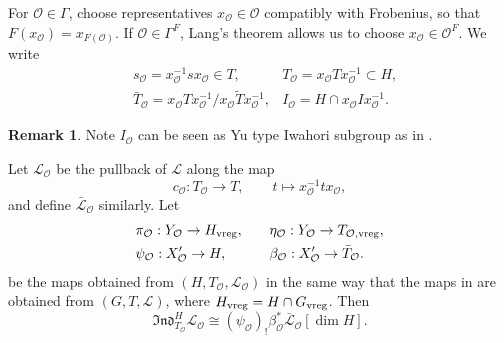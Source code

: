 \documentclass[11pt,letterpaper]{amsart}
\theoremstyle{definition}
\newtheorem{remark}[theorem]{Remark}
\numberwithin{equation}{section}
\numberwithin{theorem}{section}
\begin{document}
For \(\mathcal O\in\Gamma\), choose representatives
\(x_{\mathcal O}\in\mathcal O\) compatibly with Frobenius, so that
\(F(x_{\mathcal O})=x_{F(\mathcal O)}\).  If
\(\mathcal O\in\Gamma^F\), Lang's theorem allows us to choose
\(x_{\mathcal O}\in\mathcal O^F\).  We write
\begin{align*}
&s_{\mathcal O}=x_{\mathcal O}^{-1}sx_{\mathcal O}\in T,
&T_{\mathcal O}=x_{\mathcal O}Tx_{\mathcal O}^{-1}\subset H,\\
&\bar{T}_{\mathcal O}=x_{\mathcal O}Tx_{\mathcal O}^{-1}/x_{\mathcal O}\tilde{T}x_{\mathcal O}^{-1},
&I_{\mathcal O}
 =H\cap x_{\mathcal O}Ix_{\mathcal O}^{-1}.        
\end{align*}
\begin{remark}
Note $I_{\mathcal O}$ can be seen as Yu type Iwahori subgroup as in . 
\end{remark}

Let $\mathcal L_{\mathcal O}$ be the pullback of $\mathcal L$ along
the map
\[
 c_{\mathcal O}:T_{\mathcal O}\longrightarrow T,
 \qquad t\longmapsto x_{\mathcal O}^{-1}tx_{\mathcal O},
\]
and define $\bar{\mathcal L}_{\mathcal O}$ similarly.  Let
\begin{align*}
&\pi_{\mathcal{O}}:Y_{\mathcal{O}}\to H_{\rm{vreg}},\quad &&\eta_{\mathcal{O}}:Y_{\mathcal{O}}\to T_{\mathcal{O},\rm{vreg}},\\
&\psi_{\mathcal{O}}:X'_{\mathcal{O}}\to H,  &&\beta_{\mathcal{O}}:X'_{\mathcal{O}}\to \bar{T}_{\mathcal{O}}.
\end{align*}
be the maps obtained from $(H,T_{\mathcal O},\mathcal L_{\mathcal O})$
in the same way that the maps in  are obtained from
$(G,T,\mathcal L)$, where $H_{\rm{vreg}}=H\cap G_{\rm{vreg}}$. Then
\[
 \mathfrak{Ind}^{H}_{T_\mathcal{O}}\mathcal{L}_{\mathcal{O}}
 \cong
 ({\psi_{\mathcal{O}}})_!\beta^*_{\mathcal{O}}
 \bar{\mathcal{L}}_{\mathcal{O}}[\dim H].
\]
\end{document}
